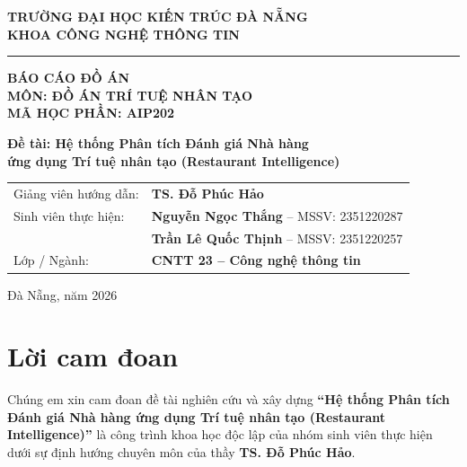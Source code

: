 \documentclass[12pt, a4paper]{article}
\begin{document}
\begin{titlepage}
\begin{center}
{\large\bfseries TRƯỜNG ĐẠI HỌC KIẾN TRÚC ĐÀ NẴNG}\\
{\large\bfseries KHOA CÔNG NGHỆ THÔNG TIN}\\[0.2cm]
\rule{0.45\textwidth}{0.8pt}

\vspace{3.0cm}

{\LARGE\bfseries BÁO CÁO ĐỒ ÁN}\\[0.35cm]
{\Large\bfseries MÔN: ĐỒ ÁN TRÍ TUỆ NHÂN TẠO}\\[0.2cm]
{\normalsize\bfseries MÃ HỌC PHẦN: AIP202}

\vspace{1.4cm}

{\Large\bfseries Đề tài: Hệ thống Phân tích Đánh giá Nhà hàng \\ ứng dụng Trí tuệ nhân tạo (Restaurant Intelligence)}

\vspace{2.2cm}

\begin{tabular}{ll}
Giảng viên hướng dẫn: & \textbf{TS. Đỗ Phúc Hảo} \\[10pt]
Sinh viên thực hiện:  & \textbf{Nguyễn Ngọc Thắng} -- MSSV: 2351220287 \\[6pt]
                      & \textbf{Trần Lê Quốc Thịnh} -- MSSV: 2351220257 \\[10pt]
Lớp / Ngành:          & \textbf{CNTT 23 -- Công nghệ thông tin} \\
\end{tabular}

\vfill

Đà Nẵng, năm 2026
\end{center}
\end{titlepage}

\newpage
{}
\setcounter{page}{1}

\section*{Lời cam đoan}

Chúng em xin cam đoan đề tài nghiên cứu và xây dựng \textbf{``Hệ thống Phân tích Đánh giá Nhà hàng ứng dụng Trí tuệ nhân tạo (Restaurant Intelligence)''} là công trình khoa học độc lập của nhóm sinh viên thực hiện dưới sự định hướng chuyên môn của thầy \textbf{TS. Đỗ Phúc Hảo}.
\end{document}
